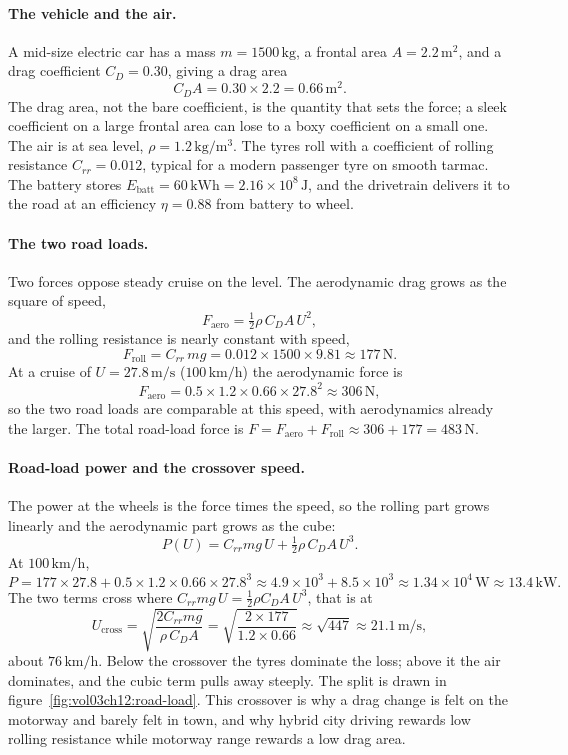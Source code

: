 \paragraph{The vehicle and the air.} A mid-size electric car has a
mass $m = 1500\,\si{\kilogram}$, a frontal area $A = 2.2\,\si{\meter
\squared}$, and a drag coefficient $C_D = 0.30$, giving a drag area
\[
C_D A = 0.30\times2.2 = 0.66\,\si{\meter\squared}.
\]
The drag area, not the bare coefficient, is the quantity that sets the
force; a sleek coefficient on a large frontal area can lose to a
boxy coefficient on a small one. The air is at sea level,
$\rho = 1.2\,\si{\kilogram\per\meter\cubed}$. The tyres roll with a
coefficient of rolling resistance $C_{rr} = 0.012$, typical for a
modern passenger tyre on smooth tarmac. The battery stores
$E_{\text{batt}} = 60\,\si{\kilo\watt\hour} = 2.16\times10^{8}\,\si{
\joule}$, and the drivetrain delivers it to the road at an efficiency
$\eta = 0.88$ from battery to wheel.

\paragraph{The two road loads.} Two forces oppose steady cruise on the
level. The aerodynamic drag grows as the square of speed,
\[
F_{\text{aero}} = \tfrac12\rho\,C_D A\,U^2,
\]
and the rolling resistance is nearly constant with speed,
\[
F_{\text{roll}} = C_{rr}\,m g = 0.012\times1500\times9.81 \approx
177\,\si{\newton}.
\]
At a cruise of $U = 27.8\,\si{\meter\per\second}$ ($100\,\text{km/h}$)
the aerodynamic force is
\[
F_{\text{aero}} = 0.5\times1.2\times0.66\times27.8^2 \approx 306\,\si{
\newton},
\]
so the two road loads are comparable at this speed, with aerodynamics
already the larger. The total road-load force is $F = F_{\text{aero}}
+ F_{\text{roll}} \approx 306 + 177 = 483\,\si{\newton}$.

\paragraph{Road-load power and the crossover speed.} The power at the
wheels is the force times the speed, so the rolling part grows
linearly and the aerodynamic part grows as the cube:
\[
P(U) = C_{rr}m g\,U + \tfrac12\rho\,C_D A\,U^3.
\]
At $100\,\text{km/h}$,
\[
P = 177\times27.8 + 0.5\times1.2\times0.66\times27.8^3 \approx 4.9
\times10^{3} + 8.5\times10^{3} \approx 1.34\times10^{4}\,\si{\watt}
\approx 13.4\,\si{\kilo\watt}.
\]
The two terms cross where $C_{rr}m g\,U = \tfrac12\rho C_D A\,U^3$,
that is at
\[
U_{\text{cross}} = \sqrt{\frac{2 C_{rr}m g}{\rho\,C_D A}} = \sqrt{
\frac{2\times177}{1.2\times0.66}} \approx \sqrt{447} \approx 21.1\,
\si{\meter\per\second},
\]
about $76\,\text{km/h}$. Below the crossover the tyres dominate the
loss; above it the air dominates, and the cubic term pulls away
steeply. The split is drawn in figure~\ref{fig:vol03ch12:road-load}.
This crossover is why a drag change is felt on the motorway and barely
felt in town, and why hybrid city driving rewards low rolling
resistance while motorway range rewards a low drag area.


